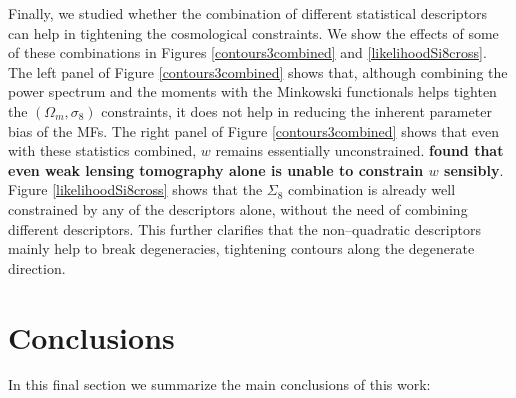 \documentclass[reprint,aps,prd,superscriptaddress,showkeys,showpacs]{revtex4-1}
\begin{document}
Finally, we studied whether the combination of different statistical
descriptors can help in tightening the cosmological constraints. We
show the effects of some of these combinations in Figures
\ref{contours3combined} and \ref{likelihoodSi8cross}. The left panel
of Figure \ref{contours3combined} shows that, although combining the
power spectrum and the moments with the Minkowski functionals helps
tighten the $(\Omega_m,\sigma_8)$ constraints, it does not help in
reducing the inherent parameter bias of the MFs. The right panel of Figure
\ref{contours3combined} shows that even with these statistics
combined, $w$ remains essentially unconstrained. \textbf{\citep{CFHTHeymansTomo} found that even weak lensing tomography alone is unable to constrain $w$ sensibly}. 
Figure \ref{likelihoodSi8cross} shows that the $\Sigma_8$ combination is
already well constrained by any of the descriptors alone, without the
need of combining different descriptors.
This further clarifies that the non--quadratic descriptors mainly help
to break degeneracies, tightening contours along the
degenerate direction.



\section{Conclusions}

In this final section we summarize the main conclusions of this work:
\end{document}
